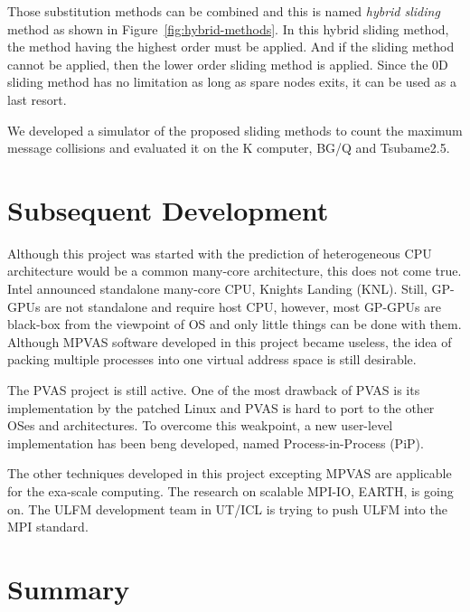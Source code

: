 Those substitution methods can be combined and this is named {\sl
hybrid sliding} method as shown in Figure~\ref{fig:hybrid-methods}. In
this hybrid sliding method, the method having the highest order must
be applied. And if the sliding method cannot be applied, then the
lower order sliding method is applied. Since the 0D sliding method has no
limitation as long as spare nodes exits, it can be used as a last resort.

We developed a simulator of the proposed sliding methods to count the 
maximum message collisions and evaluated it on the K computer, BG/Q
and Tsubame2.5\cite{Hori:2015:SSF:2802658.2802670}. 

\section{Subsequent Development}

Although this project was started with the prediction of
heterogeneous CPU architecture would be a common many-core
architecture, this does not come true. Intel announced standalone
many-core CPU, Knights Landing (KNL). Still, GP-GPUs are not
standalone and require host CPU, however, most GP-GPUs are black-box
from the viewpoint of OS and only little things can be done with
them. Although MPVAS software developed in this project became
useless, the idea of packing multiple processes into one virtual
address space is still desirable. 

The PVAS project is still active. One of the most drawback of PVAS is
its implementation by the patched Linux and PVAS is hard to port to the
other OSes and architectures. To overcome this weakpoint, a new
user-level implementation has been beng developed, named
Process-in-Process (PiP). 

The other techniques developed in this project excepting MPVAS are
applicable for the exa-scale computing. The research on scalable
MPI-IO, EARTH, is going on. The ULFM development team in UT/ICL is
trying to push ULFM into the MPI standard.

\section{Summary}
